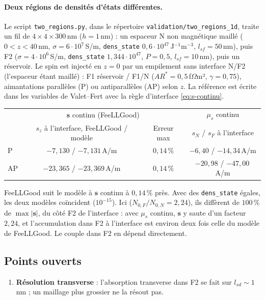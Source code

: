 \documentclass[11pt,a4paper]{article}
\newcommand{\vs}{\bm{s}}
\begin{document}
\paragraph{Deux régions de densités d'états différentes.} Le script
\texttt{two\_regions.py}, dans le répertoire
\texttt{validation/}\allowbreak\texttt{two\_regions\_1d}, traite un fil de
$4\times4\times300$\,nm ($h=1$\,nm) : un espaceur N non magnétique maillé
($0<z<40$\,nm, $\sigma=6\cdot10^7$\,S/m, \texttt{dens\_state}
$0{,}6\cdot10^{47}$\,J$^{-1}$m$^{-3}$, $l_{sf}=50$\,nm), puis F2
($\sigma=4\cdot10^6$\,S/m, \texttt{dens\_state} $1{,}344\cdot10^{47}$,
$P=0{,}5$, $l_{sf}=10$\,nm), puis un réservoir. Le spin est injecté en
$z=0$ par un empilement sans interface N/F2 (l'espaceur étant maillé) :
F1 réservoir / F1/N ($AR^*=0{,}5$\,f$\Omega$m², $\gamma=0{,}75$),
aimantations parallèles (P) ou antiparallèles (AP) selon $z$. La référence
est écrite dans les variables de Valet--Fert avec la règle d'interface
\eqref{eq:s-continu}.
\begin{center}
\renewcommand{\arraystretch}{1.2}
\begin{tabular}{lccc}
  \toprule
  & \multicolumn{2}{c}{$\vs$ continu (FeeLLGood)} & $\mu_s$ continu \\
  & $s_z$ à l'interface, FeeLLGood / modèle & Erreur max & $s_N$ / $s_F$ à l'interface \\
  \midrule
  P  & $-7{,}130$ / $-7{,}131$\,A/m & $0{,}14\,\%$ & $-6{,}40$ / $-14{,}34$\,A/m \\
  AP & $-23{,}365$ / $-23{,}369$\,A/m & $0{,}14\,\%$ & $-20{,}98$ / $-47{,}00$\,A/m \\
  \bottomrule
\end{tabular}
\end{center}
FeeLLGood suit le modèle à $\vs$ continu à $0{,}14\,\%$ près. Avec des
\texttt{dens\_state} égales, les deux modèles coïncident ($10^{-15}$). Ici
($N_{0,F}/N_{0,N}=2{,}24$), ils diffèrent de $100\,\%$ de $\max|\vs|$, du
côté F2 de l'interface : avec $\mu_s$ continu, $\vs$ y saute d'un facteur
$2{,}24$, et l'accumulation dans F2 à l'interface est environ deux fois
celle du modèle de FeeLLGood. Le couple dans F2 en dépend directement.

\subsection{Points ouverts}

\begin{enumerate}
  \item \textbf{Résolution transverse} : l'absorption transverse dans F2 se
    fait sur $l_{sd}\sim1$\,nm ; un maillage plus grossier ne la résout pas.
\end{enumerate}
\end{document}
